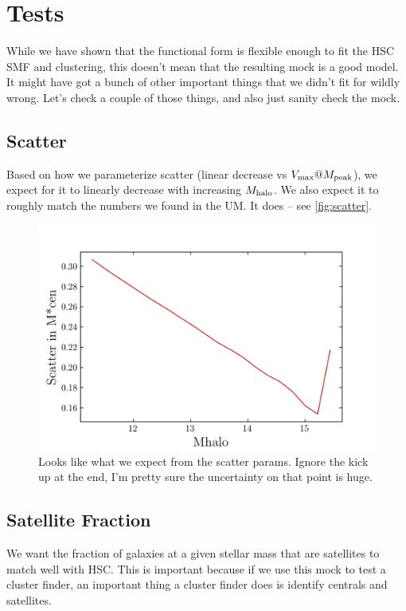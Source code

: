 \documentclass{article}
\makeatletter
\newcommand{\Mhalo}{\ensuremath{M_{\rm halo}}}
\newcommand{\vmp}{\ensuremath{V_{\rm max}@M_{\rm peak}}}
\makeatother
\begin{document}
\section{Tests}

While we have shown that the functional form is flexible enough to fit the HSC SMF and clustering, this doesn't mean that the resulting mock is a good model. It might have got a bunch of other important things that we didn't fit for wildly wrong. Let's check a couple of those things, and also just sanity check the mock.


\subsection{Scatter}
Based on how we parameterize scatter (linear decrease vs \vmp{}), we expect for it to linearly decrease with increasing \Mhalo{}. We also expect it to roughly match the numbers we found in the UM. It does -- see \autoref{fig:scatter}.

\begin{figure}[h]
    \includegraphics[width=\textwidth]{images/scatter_mcen_mhalo.png}
    \caption{Looks like what we expect from the scatter params. Ignore the kick up at the end, I'm pretty sure the uncertainty on that point is huge.
    \label{fig:scatter}
}
\end{figure}

\subsection{Satellite Fraction}

We want the fraction of galaxies at a given stellar mass that are satellites to match well with HSC. This is important because if we use this mock to test a cluster finder, an important thing a cluster finder does is identify centrals and satellites.
\end{document}
